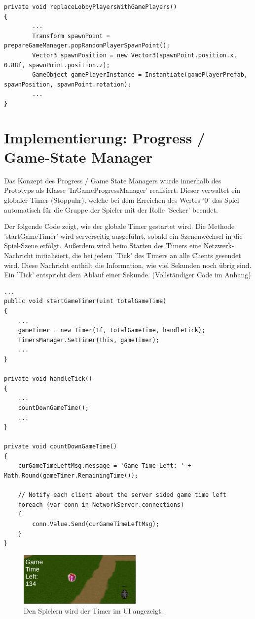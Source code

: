 \begin{lstlisting}[caption= GameNetworkManager.cs replaceLobbyPlayersWithGamePlayers()]
private void replaceLobbyPlayersWithGamePlayers()
{
		...
		Transform spawnPoint = prepareGameManager.popRandomPlayerSpawnPoint();
		Vector3 spawnPosition = new Vector3(spawnPoint.position.x, 0.88f, spawnPoint.position.z);
		GameObject gamePlayerInstance = Instantiate(gamePlayerPrefab, spawnPosition, spawnPoint.rotation);
		...
}
\end{lstlisting}


\section{Implementierung: Progress / Game-State Manager}
\label{Progress Manager}

Das Konzept des Progress / Game State Managers wurde innerhalb des Prototyps als Klasse 'InGameProgressManager' realisiert. Dieser verwaltet ein globaler Timer (Stoppuhr), welche bei dem Erreichen des Wertes '0' das Spiel automatisch für die Gruppe der Spieler mit der Rolle 'Seeker' beendet.

Der folgende Code zeigt, wie der globale Timer gestartet wird. Die Methode 'startGameTimer' wird serverseitig ausgeführt, sobald ein Szenenwechsel in die Spiel-Szene erfolgt. Außerdem wird beim Starten des Timers eine Netzwerk-Nachricht initialisiert, die bei jedem 'Tick' des Timers an alle Clients gesendet wird. Diese Nachricht enthält die Information, wie viel Sekunden noch übrig sind. Ein 'Tick' entspricht dem Ablauf einer Sekunde. (Vollständiger Code im Anhang)

\begin{lstlisting}[caption= InGameProgressManager.cs global Game Time Handling]
...
public void startGameTimer(uint totalGameTime)
{
	...
	gameTimer = new Timer(1f, totalGameTime, handleTick);
	TimersManager.SetTimer(this, gameTimer);
	...
}

private void handleTick()
{
	...
	countDownGameTime();
	...
}

private void countDownGameTime()
{
	curGameTimeLeftMsg.message = 'Game Time Left: ' + Math.Round(gameTimer.RemainingTime());
	
	// Notify each client about the server sided game time left
	foreach (var conn in NetworkServer.connections)
	{
		conn.Value.Send(curGameTimeLeftMsg);
	}
}
\end{lstlisting}

\begin{figure}[H]
	\centering
	\includegraphics[width=60mm]{images/prototyp_game_timer.png}
	\caption[Time Left Counter]{Den Spielern wird der Timer im UI angezeigt.}
	\label{pic:prototyp_game_timer}
\end{figure}

